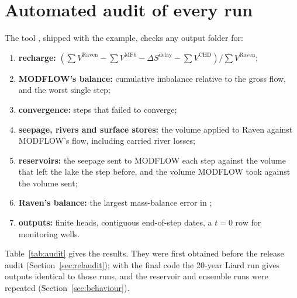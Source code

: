\section{Automated audit of every run}\label{sec:audit}
The tool , shipped with the example, checks any output folder for:
\begin{enumerate}
\item \textbf{recharge:} $\left(\sum V^{\mathrm{Raven}}-\sum V^{\mathrm{MF6}}-\Delta S^{\mathrm{delay}}-\sum V^{\mathrm{CHD}}\right)/\sum V^{\mathrm{Raven}}$;
\item \textbf{MODFLOW's balance:} cumulative imbalance relative to the gross flow, and the worst single step;
\item \textbf{convergence:} steps that failed to converge;
\item \textbf{seepage, rivers and surface stores:} the volume applied to Raven against MODFLOW's flow, including carried river losses;
\item \textbf{reservoirs:} the seepage sent to MODFLOW each step against the volume that left the lake the step before, and
      the volume MODFLOW took against the volume sent;
\item \textbf{Raven's balance:} the largest mass-balance error in ;
\item \textbf{outputs:} finite heads, contiguous end-of-step dates, a $t=0$ row for monitoring wells.
\end{enumerate}
Table~\ref{tab:audit} gives the results. They were first obtained before the release audit (Section~\ref{sec:relaudit}); with
the final code the 20-year Liard run gives outputs identical to those runs, and the reservoir and ensemble runs were repeated
(Section~\ref{sec:behaviour}).



